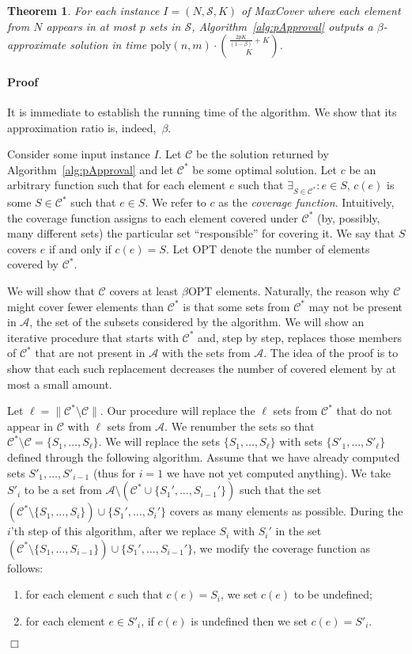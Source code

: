 \documentclass[11pt]{article}
\newcommand{\OPT}{{{{\mathrm{OPT}}}}}
\newcommand{\poly}{{\mathrm{poly}}}
\newtheorem{theorem}{Theorem}
\newenvironment{proof}{\paragraph{Proof}}{\hfill$\Box$\medskip}
\newcommand{\calC}{{{\mathcal{C}}}}
\newcommand{\calA}{{{\mathcal{A}}}}
\newcommand{\calS}{{{\mathcal{S}}}}
\begin{document}
\begin{theorem}\label{thm:pApproval}
  For each instance $I = (N,\calS,K)$ of MaxCover where each element
  from $N$ appears in at most $p$ sets in $\calS$,
  Algorithm~\ref{alg:pApproval} outputs a $\beta$-approximate solution
  in time $\poly(n,m) \cdot {\frac{2p K}{(1 - \beta)} + K \choose K}$.
\end{theorem}
\begin{proof}
  It is immediate to establish the running time of the algorithm.  We
  show that its approximation ratio is, indeed,~$\beta$.

  Consider some input instance $I$.  Let $\calC$ be the solution
  returned by Algorithm~\ref{alg:pApproval} and let $\calC^{*}$ be
  some optimal solution. Let $c$ be an arbitrary function such that
  for each element $e$ such that $\exists_{S \in \calC^{*}}: e \in S$,
  $c(e)$ is some $S \in \calC^{*}$ such that $e \in S$. We refer to
  $c$ as the \emph{coverage function}. Intuitively, the coverage
  function assigns to each element covered under $\calC^{*}$ (by,
  possibly, many different sets) the particular set ``responsible''
  for covering it.
We say that $S$ covers $e$ if and only if $c(e) = S$. Let $\OPT$
  denote the number of elements covered by $\calC^{*}$.

  We will show that $\calC$ covers at least $\beta\OPT$
  elements. Naturally, the reason why $\calC$ might cover fewer
  elements than $\calC^{*}$ is that some sets from $\calC^*$ may not
  be present in $\calA$, the set of the subsets considered by the algorithm.
  We will show an iterative procedure that
  starts with $\calC^{*}$ and, step by step, replaces those members of
  $\calC^*$ that are not present in $\calA$ with the sets from
  $\calA$. The idea of the proof is to show that each such replacement
  decreases the number of covered element by at most a small amount.

  Let $\ell = \|\calC^{*} \setminus \calC\|$. Our procedure will
  replace the $\ell$ sets from $\calC^*$ that do not appear in $\calC$
  with $\ell$ sets from $\calA$.  We renumber the sets so that
  $\calC^{*} \setminus \calC = \{S_1, \ldots, S_\ell\}$. We will
  replace the sets $\{S_1, \ldots, S_\ell\}$ with sets $\{S'_1,
  \ldots, S'_\ell\}$ defined through the following algorithm.  Assume
  that we have already computed sets $S'_1, \ldots, S'_{i-1}$ (thus
  for $i=1$ we have not yet computed anything). We take $S'_i$ to be a
  set from $\mathcal{A} \setminus (\mathcal{C}^{*} \cup \{S_1', \dots,
  S_{i-1}'\})$ such that the set $(\mathcal{C}^{*} \setminus \{S_1,
  \dots, S_{i}\}) \cup \{S_1', \dots, S_{i}'\}$ covers as many
  elements as possible. During the $i$'th step of this algorithm,
  after we replace $S_i$ with $S_i'$ in the set $(\mathcal{C}^{*}
  \setminus \{S_1, \dots, S_{i-1}\}) \cup \{S_1', \dots, S_{i-1}'\}$,
  we modify the coverage function as follows:
  \begin{enumerate}
  \item for each element $e$ such that $c(e) = S_i$, we set $c(e)$ to be undefined;
  \item for each element $e \in S'_i$, if $c(e)$ is undefined then we set $c(e) = S'_i$.
  \end{enumerate}


\end{proof}
\end{document}
